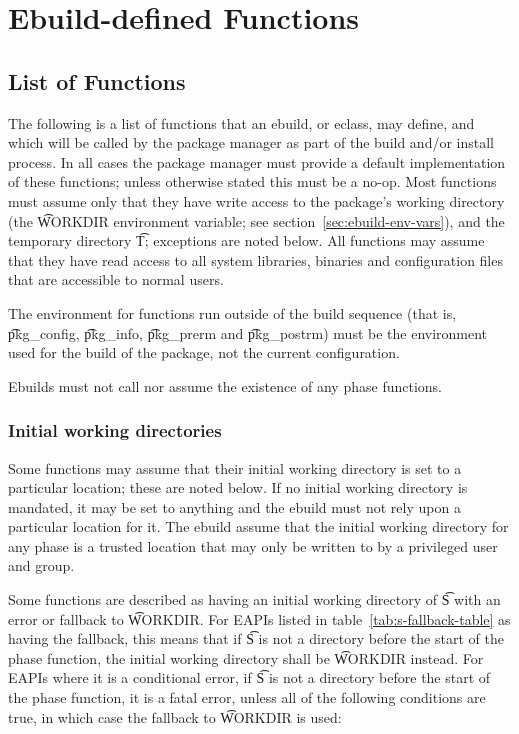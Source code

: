 \chapter{Ebuild-defined Functions}
\label{ch:ebuild-functions}

\section{List of Functions}

The following is a list of functions that an ebuild, or eclass, may define, and which will be called
by the package manager as part of the build and/or install process. In all cases the package manager
must provide a default implementation of these functions; unless otherwise stated this must be a
no-op. Most functions must assume only that they have write access to the package's working
directory (the \t{WORKDIR} environment variable; see section~\ref{sec:ebuild-env-vars}), and the
temporary directory \t{T}; exceptions are noted below. All functions may assume that they have read
access to all system libraries, binaries and configuration files that are accessible to normal
users.

The environment for functions run outside of the build sequence (that is, \t{pkg_config},
\t{pkg_info}, \t{pkg_prerm} and \t{pkg_postrm}) must be the environment used for the build of the
package, not the current configuration.

Ebuilds must not call nor assume the existence of any phase functions.

\subsection{Initial working directories}
\label{sec:s-to-workdir-fallback}

Some functions may assume that their initial working directory is set to a particular location;
these are noted below. If no initial working directory is mandated, it may be set to anything and
the ebuild must not rely upon a particular location for it. The ebuild  assume that the
initial working directory for any phase is a trusted location that may only be written to by a
privileged user and group.

 Some functions are described as having an initial working
directory of \t{S} with an error or fallback to \t{WORKDIR}\@. For EAPIs listed in
table~\ref{tab:s-fallback-table} as having the fallback, this means that if \t{S} is not a directory
before the start of the phase function, the initial working directory shall be \t{WORKDIR} instead.
For EAPIs where it is a conditional error, if \t{S} is not a directory before the start of the phase
function, it is a fatal error, unless all of the following conditions are true, in which case the
fallback to \t{WORKDIR} is used:

